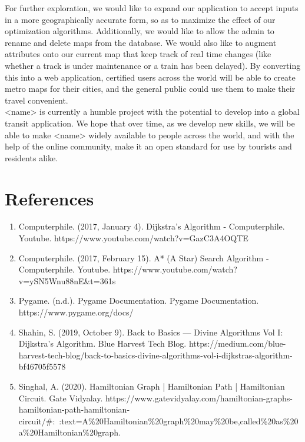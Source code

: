 \documentclass[fontsize=11pt]{article}
\begin{document}
For further exploration, we would like to expand our application to accept inputs in a more geographically accurate form, so as to maximize the effect of our optimization algorithms. Additionally, we would like to allow the admin to rename and delete maps from the database. We would also like to augment attributes onto our current map that keep track of real time changes (like whether a track is under maintenance or a train has been delayed). By converting this into a web application, certified users across the world will be able to create metro maps for their cities, and the general public could use them to make their travel convenient. \\

<name> is currently a humble project with the potential to develop into a global transit application. We hope that over time, as we develop new skills, we will be able to make <name> widely available to people across the world, and with the help of the online community, make it an open standard for use by tourists and residents alike.
    \section*{References}
    \begin{enumerate}
        \item Computerphile. (2017, January 4). Dijkstra's Algorithm - Computerphile. Youtube. https://www.youtube.com/watch?v=GazC3A4OQTE
        \item Computerphile. (2017, February 15). A* (A Star) Search Algorithm - Computerphile. Youtube. https://www.youtube.com/watch?v=ySN5Wnu88nE\&t=361s
        \item Pygame. (n.d.). Pygame Documentation. Pygame Documentation. https://www.pygame.org/docs/
        \item Shahin, S. (2019, October 9). Back to Basics — Divine Algorithms Vol I: Dijkstra’s Algorithm. Blue Harvest Tech Blog. https://medium.com/blue-harvest-tech-blog/back-to-basics-divine-algorithms-vol-i-dijkstras-algorithm-bf46705f5578
        \item Singhal, A. (2020). Hamiltonian Graph | Hamiltonian Path | Hamiltonian Circuit. Gate Vidyalay. https://www.gatevidyalay.com/hamiltonian-graphs-hamiltonian-path-hamiltonian-circuit/\#:~:text=A\%20Hamiltonian\%20graph\%20may\%20be,called\%20as\%20a\%20Hamiltonian\%20graph.

    \end{enumerate}


\end{document}
